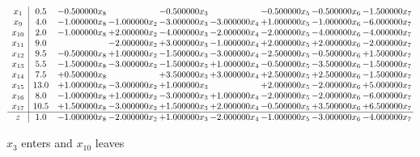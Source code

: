 \documentclass[10pt]{article}
\begin{document}
 \[\begin{array}{c| c c@{\hskip 2pt} c@{\hskip 2pt} c@{\hskip 2pt} c@{\hskip 2pt} c@{\hskip 2pt} c@{\hskip 2pt} c@{\hskip 2pt} }
 x_{1}   &  0.5 & -0.500000 x_{8} &   & -0.500000 x_{3} &   & -0.500000 x_{5} & -0.500000 x_{6} & -1.500000 x_{7}\\
 x_{9}   &  4.0 & -1.000000 x_{8} & -1.000000 x_{2} & -3.000000 x_{3} & -3.000000 x_{4} & + 1.000000 x_{5} & -1.000000 x_{6} & -6.000000 x_{7}\\
 x_{10}   &  2.0 & -1.000000 x_{8} & + 2.000000 x_{2} & -4.000000 x_{3} & -2.000000 x_{4} & -2.000000 x_{5} & -4.000000 x_{6} & -4.000000 x_{7}\\
 x_{11}   &  9.0  &   & -2.000000 x_{2} & + 3.000000 x_{3} & -1.000000 x_{4} & + 2.000000 x_{5} & + 2.000000 x_{6} & -2.000000 x_{7}\\
 x_{12}   &  9.5 & -0.500000 x_{8} & + 1.000000 x_{2} & -1.500000 x_{3} & -3.000000 x_{4} & -2.500000 x_{5} & -0.500000 x_{6} & + 1.500000 x_{7}\\
 x_{13}   &  5.5 & -1.500000 x_{8} & -3.000000 x_{2} & -1.500000 x_{3} & + 1.000000 x_{4} & -0.500000 x_{5} & -3.500000 x_{6} & -1.500000 x_{7}\\
 x_{14}   &  7.5 & + 0.500000 x_{8} &   & + 3.500000 x_{3} & + 3.000000 x_{4} & + 2.500000 x_{5} & + 2.500000 x_{6} & -1.500000 x_{7}\\
 x_{15}   &  13.0 & + 1.000000 x_{8} & -3.000000 x_{2} & + 1.000000 x_{3} &   & + 2.000000 x_{5} & -2.000000 x_{6} & + 5.000000 x_{7}\\
 x_{16}   &  8.0 & -1.000000 x_{8} & + 1.000000 x_{2} & -3.000000 x_{3} & + 1.000000 x_{4} & -2.000000 x_{5} & -2.000000 x_{6} & -6.000000 x_{7}\\
 x_{17}   &  10.5 & + 1.500000 x_{8} & -3.000000 x_{2} & + 1.500000 x_{3} & + 2.000000 x_{4} & -0.500000 x_{5} & + 3.500000 x_{6} & + 6.500000 x_{7}\\
\hline
z    &  1.0 & -1.000000 x_{8} & -2.000000 x_{2} & + 1.000000 x_{3} & -2.000000 x_{4} & -1.000000 x_{5} & -3.000000 x_{6} & -4.000000 x_{7}\\
\end{array}\]


 $ x_{3} $ enters and $ x_{10} $ leaves 
\end{document}
